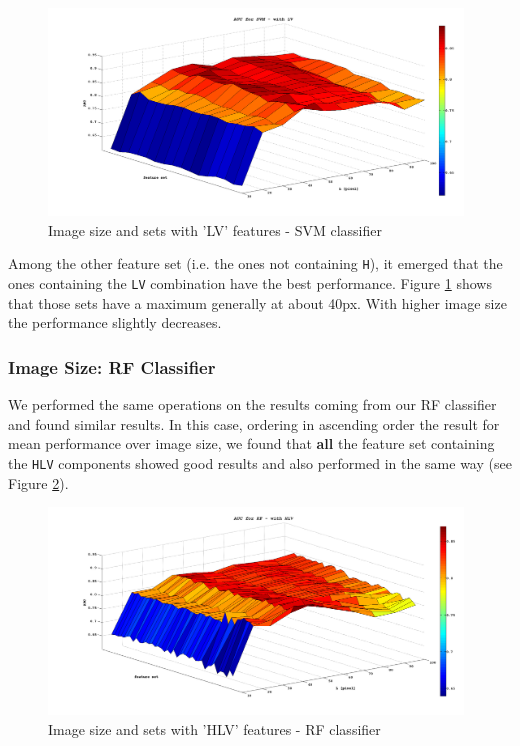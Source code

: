 \begin{figure}[!hb]
 \begin{center}
  \includegraphics[width=0.98\textwidth]{./images/exp07/SVM_AUC_LV.png}
  \caption{Image size and sets with 'LV' features - SVM classifier}
  \label{ch6:fig18}
 \end{center}
\end{figure}

Among the other feature set (i.e. the ones not containing \texttt{H}), it emerged that the ones containing the \texttt{LV} combination have the best performance.
Figure \ref{ch6:fig18} shows that those sets have a maximum generally at about 40px. With higher image size the performance slightly decreases.


\vspace{0.5cm}


\subsubsection{Image Size: RF Classifier}

We performed the same operations on the results coming from our \Gls{RF} classifier and found similar results. In this case, ordering in ascending order 
the result for mean performance over image size, we found that \textbf{all} the feature set containing the \texttt{HLV} components showed good results and
also performed in the same way (see Figure \ref{ch6:fig19}).

\begin{figure}[!ht]
 \begin{center}
  \includegraphics[width=0.98\textwidth]{./images/exp07/RF_AUC_HLV.png}
  \caption{Image size and sets with 'HLV' features - RF classifier}
  \label{ch6:fig19}
 \end{center}
\end{figure}

